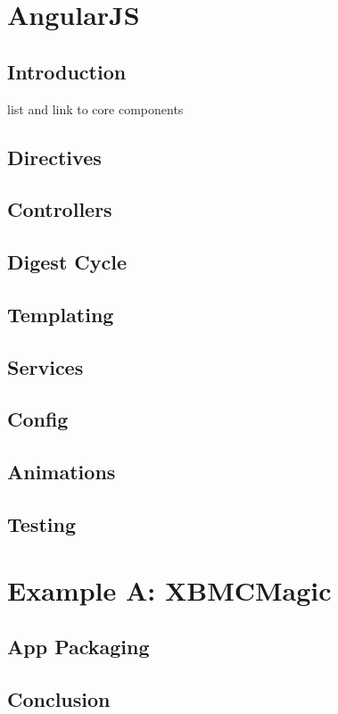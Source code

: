

\chapter{AngularJS}
\section{Introduction}

list and link to core components

\section{Directives}
\section{Controllers}
\section{Digest Cycle}
\section{Templating}
\section{Services}
\section{Config}
\section{Animations}
\section{Testing}

\chapter{Example A: XBMCMagic}
\label{ch:xbmc}



\section{App Packaging}
\section{Conclusion}

